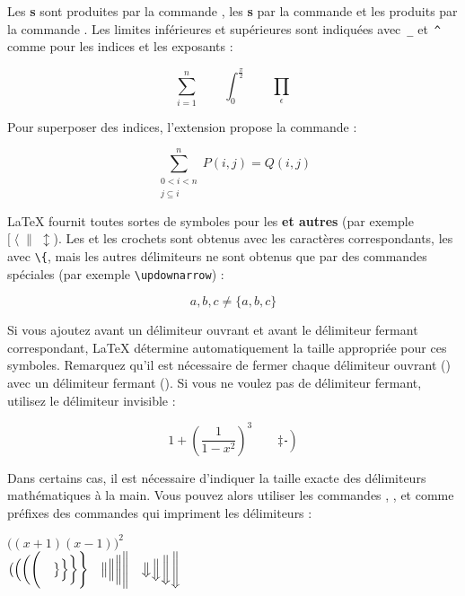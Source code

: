 Les \textbf{s} sont produites par la commande ,
les \textbf{s} par la commande  et les produits par la
commande . Les limites
inférieures et supérieures sont indiquées avec~\verb|_| et~\verb|^|
comme pour les indices et les exposants :
\begin{example}
\begin{equation*}
\sum_{i=1}^n \qquad
\int_0^{\frac{\pi}{2}} \qquad
\prod_\epsilon
\end{equation*}
\end{example}

Pour superposer des indices, l'extension  propose la
commande  :
\begin{example}
\begin{equation*}
\sum^n_{\substack{0<i<n \\ 
        j\subseteq i}}
   P(i,j) = Q(i,j)
\end{equation*}
\end{example}

\LaTeX{} fournit toutes sortes de symboles pour les
\textbf{ et autres } (par exemple
$[\;\langle\;\|\;\updownarrow$). Les  et les crochets
sont obtenus avec les caractères correspondants, les 
avec \verb|\{|, mais les autres délimiteurs ne sont obtenus que par des
commandes spéciales (par exemple \verb|\updownarrow|) :
\begin{example}
\begin{equation*}
{a,b,c} \neq \{a,b,c\}
\end{equation*}
\end{example}

Si vous ajoutez  avant un délimiteur ouvrant et
\vadjust{\pagebreak[3]}%
 avant le délimiteur fermant correspondant, \LaTeX{} détermine
automatiquement la taille appropriée pour ces symboles. Remarquez
qu'il est nécessaire de fermer chaque délimiteur ouvrant
() avec un délimiteur fermant (). Si vous
ne voulez pas de délimiteur fermant, utilisez le délimiteur invisible
\og {} \fg{} :
\begin{example}
\begin{equation*}
1 + \left(\frac{1}{1-x^{2}}
    \right)^3 \qquad 
\left. \ddagger \frac{~}{~}\right)
\end{equation*}
\end{example}

Dans certains cas, il est nécessaire d'indiquer la taille exacte des
délimiteurs mathématiques à la main. Vous pouvez alors utiliser les
commandes , ,  et  comme préfixes
des commandes qui impriment les délimiteurs :
\begin{example}
$\Big((x+1)(x-1)\Big)^{2}$\\
$\big( \Big( \bigg( \Bigg( \quad
\big\} \Big\} \bigg\} \Bigg\}\quad
\big\| \Big\| \bigg\| \Bigg\|\quad
\big\Downarrow \Big\Downarrow 
\bigg\Downarrow \Bigg\Downarrow$
\end{example}

